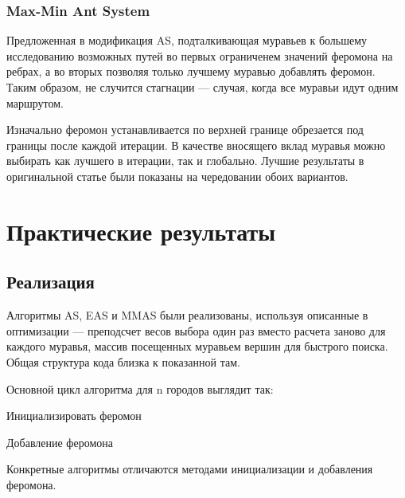 \documentclass{article}
\begin{document}
\subsubsection{Max-Min Ant System}
Предложенная в \cite{MMAS} модификация AS, подталкивающая муравьев к большему исследованию возможных путей во первых ограниченем значений феромона на ребрах, а во вторых позволяя только лучшему муравью добавлять феромон. Таким образом, не случится стагнации --- случая, когда все муравьи идут одним маршрутом.

Изначально феромон устанавливается по верхней границе обрезается под границы после каждой итерации. В качестве вносящего вклад муравья можно выбирать как лучшего в итерации, так и глобально. Лучшие результаты в оригинальной статье были показаны на чередовании обоих вариантов.

\section{Практические результаты}
\subsection{Реализация}
Алгоритмы AS, EAS и MMAS были реализованы, используя описанные в \cite{4129846} оптимизации --- преподсчет весов выбора один раз вместо расчета заново для каждого муравья, массив посещенных муравьем вершин для быстрого поиска. Общая структура кода близка к показанной там.

Основной цикл алгоритма для n городов выглядит так:
\begin{algorithm}
\caption{Ant System}
Инициализировать феромон\;

\end{algorithm}

\begin{algorithm}
\caption{Обновить феромон}
Добавление феромона\;
\end{algorithm}

Конкретные алгоритмы отличаются методами инициализации и добавления феромона.
\newpage
\begin{algorithm}
\caption{Добавление феромона AS}
\end{algorithm}
\end{document}
